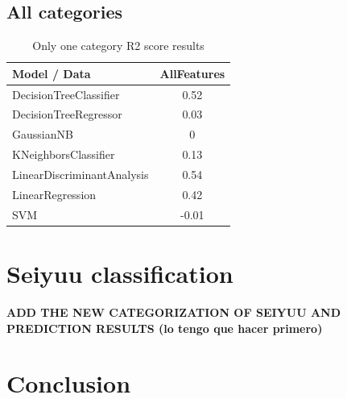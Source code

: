 \FloatBarrier
\subsection{All categories}
\begin{table}[!hbt]
	\begin{center}
	\caption{Only one category R2 score results}
	\label{tab:allCategories}
	\begin{tabular}{|l|c|}
		\hline
		Model / Data & AllFeatures \\
		\hline
		DecisionTreeClassifier & 0.52 \\
		\hline
		DecisionTreeRegressor & 0.03 \\
		\hline
		GaussianNB & 0 \\
		\hline
		KNeighborsClassifier & 0.13 \\
		\hline
		LinearDiscriminantAnalysis & 0.54 \\
		\hline
		LinearRegression & 0.42 \\
		\hline
		SVM & -0.01 \\
		\hline
	\end{tabular}
	\end{center}
\end{table}

\section{Seiyuu classification}
\textbf{ADD THE NEW CATEGORIZATION OF SEIYUU AND PREDICTION RESULTS (lo tengo que hacer primero)}

\section{Conclusion}
